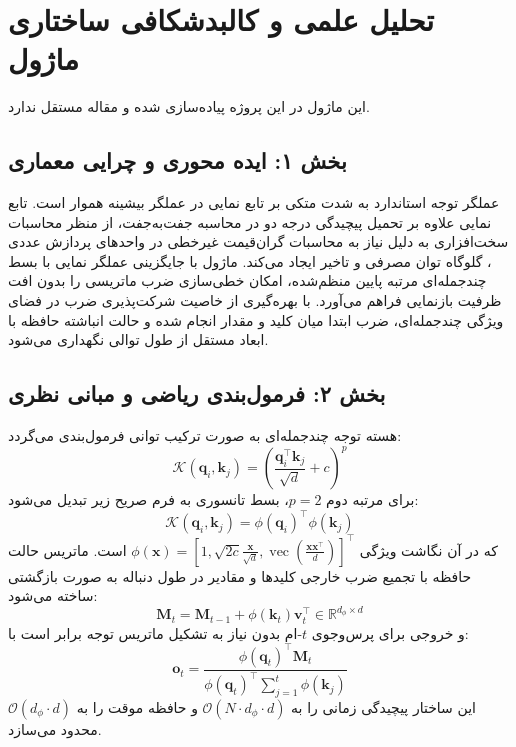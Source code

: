 \section{تحلیل علمی و کالبدشکافی ساختاری ماژول }

این ماژول در این پروژه پیاده‌سازی شده و مقاله مستقل ندارد.
\label{sec:padre}

\subsection*{بخش ۱: ایده محوری و چرایی معماری }
عملگر توجه استاندارد به شدت متکی بر تابع نمایی در عملگر بیشینه هموار  است. تابع نمایی علاوه بر تحمیل پیچیدگی درجه دو در محاسبه جفت‌به‌جفت، از منظر محاسبات سخت‌افزاری به دلیل نیاز به محاسبات گران‌قیمت غیرخطی  در واحدهای پردازش عددی ، گلوگاه توان مصرفی و تاخیر ایجاد می‌کند. ماژول  با جایگزینی عملگر نمایی با بسط چندجمله‌ای مرتبه پایین منظم‌شده، امکان خطی‌سازی ضرب ماتریسی را بدون افت ظرفیت بازنمایی فراهم می‌آورد. با بهره‌گیری از خاصیت شرکت‌پذیری ضرب در فضای ویژگی چندجمله‌ای، ضرب ابتدا میان کلید و مقدار انجام شده و حالت انباشته حافظه با ابعاد مستقل از طول توالی نگهداری می‌شود.

\subsection*{بخش ۲: فرمول‌بندی ریاضی و مبانی نظری }
هسته توجه چندجمله‌ای به صورت ترکیب توانی فرمول‌بندی می‌گردد:
\begin{equation}
\mathcal{K}(\mathbf{q}_i, \mathbf{k}_j) = \left( \frac{\mathbf{q}_i^\top \mathbf{k}_j}{\sqrt{d}} + c \right)^p
\end{equation}
برای مرتبه دوم $p=2$، بسط تانسوری به فرم صریح زیر تبدیل می‌شود:
\begin{equation}
\mathcal{K}(\mathbf{q}_i, \mathbf{k}_j) = \phi(\mathbf{q}_i)^\top \phi(\mathbf{k}_j)
\end{equation}
که در آن نگاشت ویژگی $\phi(\mathbf{x}) = \left[ 1, \sqrt{2c}\frac{\mathbf{x}}{\sqrt{d}}, \operatorname{vec}\left(\frac{\mathbf{x}\mathbf{x}^\top}{d}\right) \right]^\top$ است. ماتریس حالت حافظه با تجمیع ضرب خارجی کلیدها و مقادیر در طول دنباله به صورت بازگشتی ساخته می‌شود:
\begin{equation}
\mathbf{M}_t = \mathbf{M}_{t-1} + \phi(\mathbf{k}_t) \mathbf{v}_t^\top \in \mathbb{R}^{d_{\phi} \times d}
\end{equation}
و خروجی برای پرس‌وجوی $t$-ام بدون نیاز به تشکیل ماتریس توجه برابر است با:
\begin{equation}
\mathbf{o}_t = \frac{\phi(\mathbf{q}_t)^\top \mathbf{M}_t}{\phi(\mathbf{q}_t)^\top \sum_{j=1}^t \phi(\mathbf{k}_j)}
\end{equation}
این ساختار پیچیدگی زمانی را به $\mathcal{O}(N \cdot d_{\phi} \cdot d)$ و حافظه موقت را به $\mathcal{O}(d_{\phi} \cdot d)$ محدود می‌سازد.

